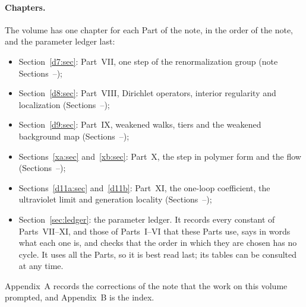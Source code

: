 \paragraph{Chapters.} The volume has one chapter for each Part of the note, in the order of the note, and the parameter ledger last:
\begin{itemize}
\item Section~\ref{d7:sec}: Part~VII, one step of the renormalization group (note Sections~--);
\item Section~\ref{d8:sec}: Part~VIII, Dirichlet operators, interior regularity and localization (Sections~--);
\item Section~\ref{d9:sec}: Part~IX, weakened walks, tiers and the weakened background map (Sections~--);
\item Sections~\ref{xa:sec} and~\ref{xb:sec}: Part~X, the step in polymer form and the flow (Sections~--);
\item Sections~\ref{d11a:sec} and~\ref{d11b}: Part~XI, the one-loop coefficient, the ultraviolet limit and generation locality (Sections~--);
\item Section~\ref{sec:ledger}: the parameter ledger. It records every constant of Parts~VII--XI, and those of Parts~I--VI that these Parts use, says in words what each one is, and checks that the order in which they are chosen has no cycle. It uses all the Parts, so it is best read last; its tables can be consulted at any time.
\end{itemize}
Appendix~A records the corrections of the note that the work on this volume prompted, and Appendix~B is the index.

